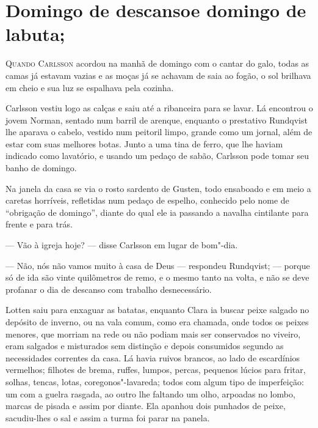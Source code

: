 \oneside

\chapter[Domingo de descanso e domingo de labuta\ldots]{Domingo de descanso\break e domingo de
labuta;} 

\textsc{Quando Carlsson} acordou na manhã de domingo com o cantar do galo, todas
as camas já estavam vazias e as moças já se achavam de saia ao fogão, o sol
brilhava em cheio e sua luz se espalhava pela cozinha.

Carlsson vestiu logo as calças e saiu até a ribanceira para se lavar. Lá
encontrou o jovem Norman, sentado num barril de arenque, enquanto o prestativo
Rundqvist lhe aparava o cabelo, vestido num peitoril limpo, grande como um
jornal, além de estar com suas melhores botas. Junto a uma tina de ferro, que
lhe haviam indicado como lavatório, e usando um pedaço de sabão, Carlsson
pode tomar seu banho de domingo.

Na janela da casa se via o rosto sardento de Gusten, todo ensaboado e em meio a
caretas horríveis, refletidas num pedaço de espelho, conhecido pelo nome de
``obrigação de domingo'', diante do qual ele ia passando a navalha cintilante
para frente e para trás.

--- Vão à igreja hoje? --- disse Carlsson em lugar de bom"-dia.

--- Não, nós não vamos muito à casa de Deus --- respondeu Rundqvist; --- porque só
de ida são vinte quilômetros de remo, e o mesmo tanto na volta, e não se deve
profanar o dia de descanso com trabalho desnecessário.

Lotten saiu para enxaguar as batatas, enquanto Clara ia buscar peixe salgado
no depósito de inverno, ou na vala comum, como era chamada, onde todos
os peixes menores, que morriam na rede ou não podiam mais ser conservados no
viveiro, eram salgados e misturados sem distinção e depois consumidos segundo as
necessidades correntes da casa. Lá havia ruivos brancos, ao lado de escardínios
vermelhos; filhotes de brema, ruffes, lumpos, percas, pequenos lúcios para
fritar, solhas, tencas, lotas, coregonos"-lavareda; todos com algum tipo de
imperfeição: um com a guelra rasgada, ao outro lhe faltando um olho, arpoadas no
lombo, marcas de pisada e assim por diante. Ela apanhou dois punhados de peixe,
sacudiu-lhes o sal e assim a turma foi parar na panela.


